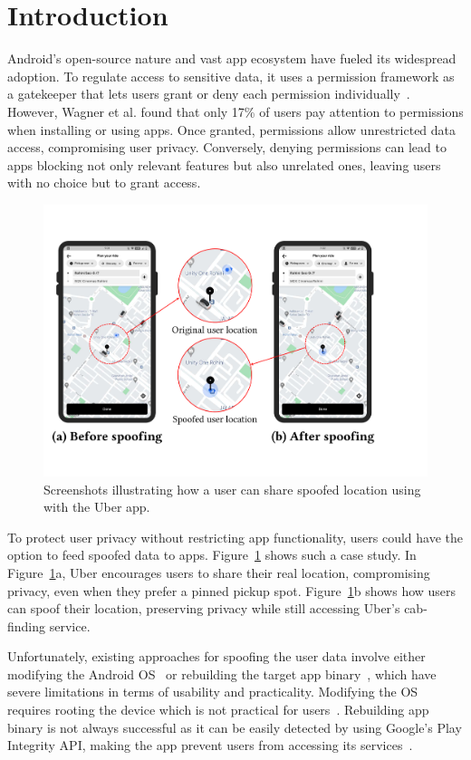 \section{Introduction}
\label{sec:introduction}

Android's open-source nature and vast app ecosystem have fueled its widespread adoption. To regulate access to sensitive data, it uses a permission framework as a gatekeeper that lets users grant or deny each permission individually~\cite{alkindi2019android}. However, Wagner et al.\cite{ha2013android} found that only 17\% of users pay attention to permissions when installing or using apps. Once granted, permissions allow unrestricted data access, compromising user privacy\cite{alkindi2019android}. Conversely, denying permissions can lead to apps blocking not only relevant features but also unrelated ones, leaving users with no choice but to grant access.

\begin{figure}[t]
    \centering
    \includegraphics[width=0.75\linewidth]{Figures/Case Studies/uber_screenshots.pdf}
    \caption{Screenshots illustrating how a user can share spoofed location using \framework{} with the Uber app.}
    \label{fig:intro_case_study_uber}
\end{figure}

To protect user privacy without restricting app functionality, users could have the option to feed spoofed data to apps. Figure~\ref{fig:intro_case_study_uber} shows such a case study. In Figure~\ref{fig:intro_case_study_uber}a, Uber encourages users to share their real location, compromising privacy, even when they prefer a pinned pickup spot. Figure~\ref{fig:intro_case_study_uber}b shows how users can spoof their location, preserving privacy while still accessing Uber's cab-finding service.

Unfortunately, existing approaches for spoofing the user data involve either modifying the Android OS~\cite{smalley2013security,raval2016you,wu2017context} or rebuilding the target app binary~\cite{backes2015boxify,jeon2012dr}, which have severe limitations in terms of usability and practicality. Modifying the OS requires rooting the device which is not practical for users~\cite{zhang2015android}. Rebuilding app binary is not always successful as it can be easily detected by using Google's Play Integrity API, making the app prevent users from accessing its services~\cite{andPlayIntAPI}. 

